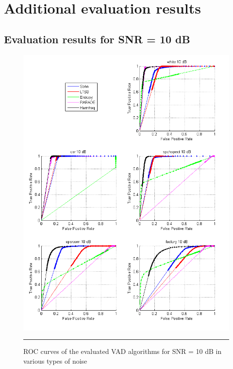 
\chapter{Additional evaluation results} %

\label{AppendixA} %


\section{Evaluation results for SNR = 10 dB}

\begin{figure}[htbp]
	\centering
		\includegraphics[width=1.0\columnwidth]{Figures/Chapter3/10dB.png}
		\rule{37em}{0.5pt}
	\caption[ROC curves of the evaluated VAD algorithms for SNR = 10 dB in various types of noise]{ROC curves of the evaluated VAD algorithms for SNR = 10 dB in various types of noise}
	\label{fig:10dB}
\end{figure}

